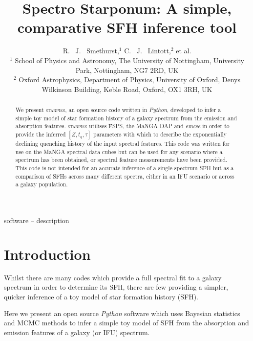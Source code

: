 \documentclass[useAMS,usenatbib]{mn2e}
\begin{document}
\title[There's something about \textsc{starpies}]{Spectro Starponum: A simple, comparative SFH inference tool}
\author[Smethurst et al. 2018]{R. ~J. ~Smethurst,$^{1}$ C. ~J. ~Lintott,$^{2}$ et al.
\\ $^1$ School of Physics and Astronomy, The University of Nottingham, University Park, Nottingham, NG7 2RD, UK
\\ $^2$ Oxford Astrophysics, Department of Physics, University of Oxford, Denys Wilkinson Building, Keble Road, Oxford, OX1 3RH, UK
}

\maketitle

\begin{abstract}
We present \textsc{starpies}, an open source code written in \emph{Python}, developed to infer a simple toy model of star formation history of a galaxy spectrum from the emission and absorption features. \textsc{starpies} utilises FSPS, the MaNGA DAP and \emph{emcee} in order to provide the inferred $[Z, t_q, \tau]$ parameters with which to describe the exponentially declining quenching history of the input spectral features. This code was written for use on the MaNGA spectral data cubes but can be used for any scenario where a spectrum has been obtained, or spectral feature measurements have been provided. This code is not intended for an accurate inference of a single spectrum SFH but as a comparison of SFHs across many different spectra, either in an IFU scenario or across a galaxy population.
\end{abstract}

\begin{keywords}
software -- description
\end{keywords}

\section{Introduction}

Whilst there are many codes which provide a full spectral fit to a galaxy spectrum in order to determine its SFH, there are few providing a simpler, quicker inference of a toy model of star formation history (SFH). 

Here we present an open source \emph{Python} software which uses Bayesian statistics and MCMC methods to infer a simple toy model of SFH from the absorption and emission features of a galaxy (or IFU) spectrum. 
\end{document}
